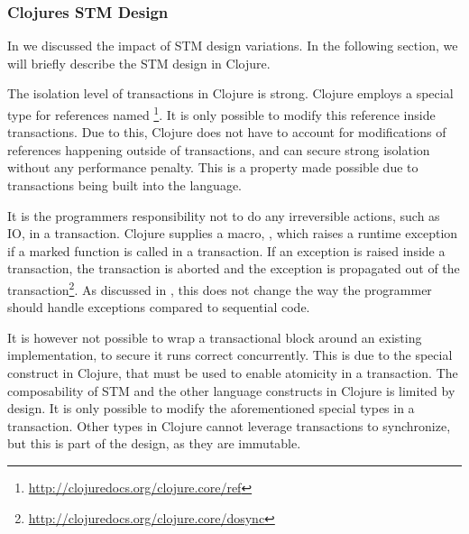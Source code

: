 
\subsubsection{Clojures \acs{STM} Design}
In  we discussed the impact of \ac{STM} design variations. In the following section, we will briefly describe the \ac{STM} design in Clojure.

The isolation level of transactions in Clojure is strong. Clojure employs a special type for references named \footnote{\url{http://clojuredocs.org/clojure.core/ref}}. It is only possible to modify this reference  inside transactions. Due to this, Clojure does not have to account for modifications of references happening outside of transactions, and can secure strong isolation without any performance penalty. This is a property made possible due to transactions being built into the language. 

It is the programmers responsibility not to do any irreversible actions, such as \ac{IO}, in a transaction. Clojure supplies a macro, , which raises a runtime exception if a marked function is called in a transaction. If an exception is raised inside a transaction, the transaction is aborted and the exception is propagated out of the transaction\footnote{\url{http://clojuredocs.org/clojure.core/dosync}}. As discussed in , this does not change the way the programmer should handle exceptions compared to sequential code. 

It is however not possible to wrap a transactional block around an existing implementation, to secure it runs correct concurrently. This is due to the special  construct in Clojure, that must be used to enable atomicity in a transaction. The composability of \ac{STM} and the other language constructs in Clojure is limited by design. It is only possible to modify the aforementioned special types in a transaction. Other types in Clojure cannot leverage transactions to synchronize, but this is part of the design, as they are immutable. 

